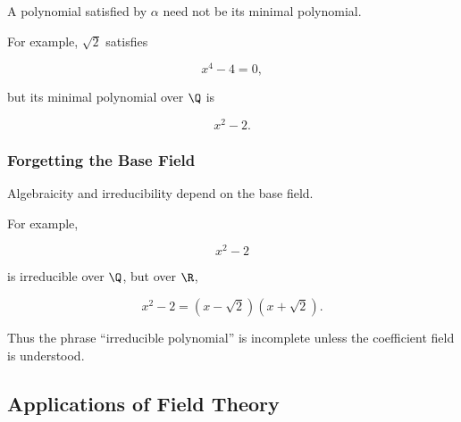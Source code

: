 A polynomial satisfied by \(\alpha\) need not be its minimal polynomial.

For example, \(\sqrt2\) satisfies

\[ x^4-4=0, \]

but its minimal polynomial over \(\Q\) is

\[ x^2-2. \]

\subsubsection{Forgetting the Base Field}

Algebraicity and irreducibility depend on the base field.

For example,

\[ x^2-2 \]

is irreducible over \(\Q\), but over \(\R\),

\[ x^2-2=(x-\sqrt2)(x+\sqrt2). \]

Thus the phrase ``irreducible polynomial'' is incomplete unless the
coefficient field is understood.

\subsection{Applications of Field Theory}
\label{subsec:field-theory-applications}

